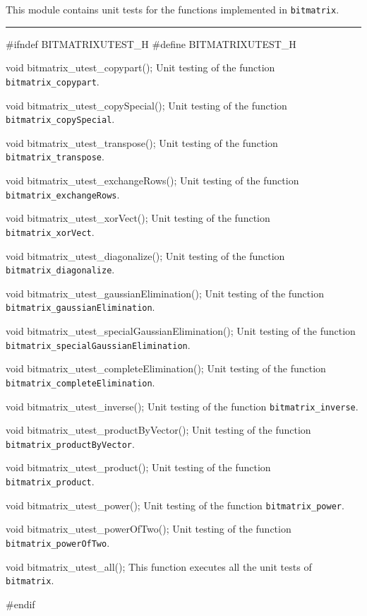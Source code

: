 
This module contains unit tests for the functions implemented in {\tt bitmatrix}. 

\bigskip
\hrule
\code
\hide
#ifndef BITMATRIXUTEST_H
#define BITMATRIXUTEST_H
\endhide
\endcode

\code
void bitmatrix_utest_copypart();
\endcode
 \tab  Unit testing of the function {\tt bitmatrix\_copypart}.
 \endtab
\code

void bitmatrix_utest_copySpecial();
\endcode
 \tab  Unit testing of the function {\tt bitmatrix\_copySpecial}.
 \endtab
\code

void bitmatrix_utest_transpose();
\endcode
 \tab  Unit testing of the function {\tt bitmatrix\_transpose}.
 \endtab
\code

void bitmatrix_utest_exchangeRows();
\endcode
 \tab  Unit testing of the function {\tt bitmatrix\_exchangeRows}.
 \endtab
\code

void bitmatrix_utest_xorVect();
\endcode
 \tab  Unit testing of the function {\tt bitmatrix\_xorVect}.
 \endtab
\code

void bitmatrix_utest_diagonalize();
\endcode
 \tab  Unit testing of the function {\tt bitmatrix\_diagonalize}.
 \endtab
\code

void bitmatrix_utest_gaussianElimination();
\endcode
 \tab  Unit testing of the function {\tt bitmatrix\_gaussianElimination}.
 \endtab
\code

void bitmatrix_utest_specialGaussianElimination();
\endcode
 \tab  Unit testing of the function {\tt bitmatrix\_specialGaussianElimination}.
 \endtab
\code

void bitmatrix_utest_completeElimination();
\endcode
 \tab  Unit testing of the function {\tt bitmatrix\_completeElimination}.
 \endtab
\code

void bitmatrix_utest_inverse();
\endcode
 \tab  Unit testing of the function {\tt bitmatrix\_inverse}.
 \endtab
\code

void bitmatrix_utest_productByVector();
\endcode
 \tab  Unit testing of the function {\tt bitmatrix\_productByVector}.
 \endtab
\code

void bitmatrix_utest_product();
\endcode
 \tab  Unit testing of the function {\tt bitmatrix\_product}.
 \endtab
\code

void bitmatrix_utest_power();
\endcode
 \tab  Unit testing of the function {\tt bitmatrix\_power}.
 \endtab
\code

void bitmatrix_utest_powerOfTwo();
\endcode
 \tab  Unit testing of the function {\tt bitmatrix\_powerOfTwo}.
 \endtab
\code

void bitmatrix_utest_all();
\endcode
 \tab  This function executes all the unit tests of {\tt bitmatrix}.
 \endtab
\code

\hide
#endif
\endhide
\endcode
